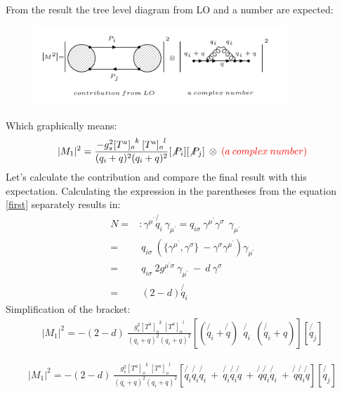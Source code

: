 From the result the tree level diagram from LO and a number are expected:\\
\begin{figure}[h!]
\centering
\includegraphics[width=0.85\textwidth]{images/QQ/expectationqg-qbar.png}
\end{figure}
Which graphically means:\\
\begin{equation}
\begin{split}
|M_1|^2=\frac{-g_s^2  {[T^a]_{o}}^k \: {[T^a]_o}^l }{(q_i + q)^2 (q_i + q)^2}
[\not{P_i}]
[\not{P_j}]\:\otimes \: {\color[RGB]{255,0,0} (a\: complex\: number)}
\end{split}
\end{equation}  
Let's calculate the contribution and compare the final result with this expectation. Calculating the expression in the parentheses from the equation \ref{first} separately results in:
\begin{equation}
\begin{split}
N=&: \gamma^{{\mu}^{\prime}} \not{q_i} \: \gamma_{{\mu}^{\prime}} = {q_{i\sigma}} \: \gamma^{{\mu}^{\prime}} \gamma^{\sigma} \:\: \gamma_{{\mu}^{\prime}}\\
=& \: {q_{i\sigma}} \: (\lbrace{\gamma^{{\mu}^{\prime}}}, {\gamma^{\sigma}}\rbrace \: - {\gamma^{\sigma}}{\gamma^{{\mu}^{\prime}}})\gamma_{{\mu}^{\prime}}\\
=& \:{q_{i\sigma}} \: 2g^{{{\mu}^{\prime}}{\sigma}} \: \gamma_{{\mu}^{\prime}} \: - \:d\:{\gamma^{\sigma}}\\
=& \:(2-d) \not{q_i}
\end{split}
\end{equation}
Simplification of the bracket:
\begin{equation}
\begin{split}
|M_1|^2=-(2-d)\:\frac{g_s^2  {[T^a]_{o}}^k \: {[T^a]_o}^l }{(q_i + q)^2 (q_i + q)^2}
[(\not{q_i} + \not{q}) \:
 \:\not{q_i} \: 
 \: (\not{q_i} + q)]
[\not{q_j}]
\end{split}
\end{equation}

\begin{equation}
\begin{split}
|M_1|^2=-(2-d)\:\frac{g_s^2  {[T^a]_{o}}^k \: {[T^a]_o}^l }{(q_i + q)^2 (q_i + q)^2}
[\not{q_i} \not{q_i} \not{q_i} \: + \: \not{q_i} \not{q_i} \not{q} \: + \: \not{q} \not{q_i} \not{q_i} \:+\: \not{q} \not{q_i} \not{q}]
[\not{q_j}]
\end{split}
\end{equation}

